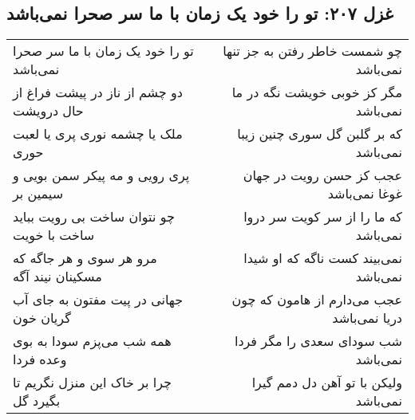 \begin{center}
\section*{غزل ۲۰۷: تو را خود یک زمان با ما سر صحرا نمی‌باشد}
\label{sec:207}
\begin{longtable}{l p{0.5cm} r}
تو را خود یک زمان با ما سر صحرا نمی‌باشد
&&
چو شمست خاطر رفتن به جز تنها نمی‌باشد
\\
دو چشم از ناز در پیشت فراغ از حال درویشت
&&
مگر کز خوبی خویشت نگه در ما نمی‌باشد
\\
ملک یا چشمه نوری پری یا لعبت حوری
&&
که بر گلبن گل سوری چنین زیبا نمی‌باشد
\\
پری رویی و مه پیکر سمن بویی و سیمین بر
&&
عجب کز حسن رویت در جهان غوغا نمی‌باشد
\\
چو نتوان ساخت بی رویت بباید ساخت با خویت
&&
که ما را از سر کویت سر دروا نمی‌باشد
\\
مرو هر سوی و هر جاگه که مسکینان نیند آگه
&&
نمی‌بیند کست ناگه که او شیدا نمی‌باشد
\\
جهانی در پیت مفتون به جای آب گریان خون
&&
عجب می‌دارم از هامون که چون دریا نمی‌باشد
\\
همه شب می‌پزم سودا به بوی وعده فردا
&&
شب سودای سعدی را مگر فردا نمی‌باشد
\\
چرا بر خاک این منزل نگریم تا بگیرد گل
&&
ولیکن با تو آهن دل دمم گیرا نمی‌باشد
\\
\end{longtable}
\end{center}
